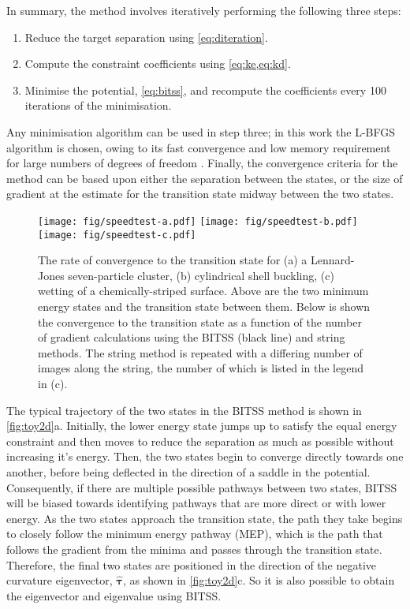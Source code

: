 \documentclass[aps,twocolumn]{revtex4-1}
\begin{document}
\topic In summary, the method involves iteratively performing the following three steps:
\begin{enumerate}
  \item Reduce the target separation using \cref{eq:diteration}.
  \item Compute the constraint coefficients using \cref{eq:ke,eq:kd}.
  \item Minimise the potential, \cref{eq:bitss}, and recompute the coefficients every 100 iterations of the minimisation.
\end{enumerate}
Any minimisation algorithm can be used in step three; in this work the L-BFGS algorithm is chosen, owing to its fast convergence and low memory requirement for large numbers of degrees of freedom \cite{Liu1989}.
Finally, the convergence criteria for the method can be based upon either the separation between the states, or the size of gradient at the estimate for the transition state midway between the two states.

\begin{figure*}[tb]
  \centering
  \texttt{[image: fig/speedtest-a.pdf]}%
  \texttt{[image: fig/speedtest-b.pdf]}%
  \texttt{[image: fig/speedtest-c.pdf]}%
  \caption{
    The rate of convergence to the transition state for (a) a Lennard-Jones seven-particle cluster, (b) cylindrical shell buckling, (c) wetting of a chemically-striped surface.
    Above are the two minimum energy states and the transition state between them.
    Below is shown the convergence to the transition state as a function of the number of gradient calculations using the BITSS (black line) and string methods.
    The string method is repeated with a differing number of images along the string, the number of which is listed in the legend in (c).
  }
  \label{fig:speedtest}
\end{figure*}

\topic The typical trajectory of the two states in the BITSS method is shown in \cref{fig:toy2d}a.
Initially, the lower energy state jumps up to satisfy the equal energy constraint and then moves to reduce the separation as much as possible without increasing it's energy.
Then, the two states begin to converge directly towards one another, before being deflected in the direction of a saddle in the potential.
Consequently, if there are multiple possible pathways between two states, BITSS will be biased towards identifying pathways that are more direct or with lower energy.
As the two states approach the transition state, the path they take begins to closely follow the minimum energy pathway (MEP), which is the path that follows the gradient from the minima and passes through the transition state.
Therefore, the final two states are positioned in the direction of the negative curvature eigenvector, $\bm{\hat{\tau}}$, as shown in \cref{fig:toy2d}c.
So it is also possible to obtain the eigenvector and eigenvalue using BITSS.
\end{document}
